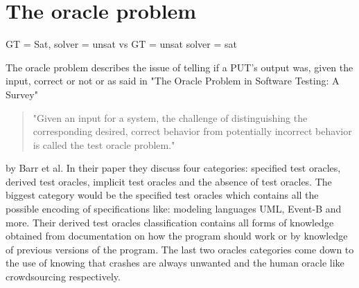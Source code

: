 \section{The oracle problem}
\label{cha:2:OracleProblem}
GT = Sat, solver = unsat vs GT = unsat solver = sat

The oracle problem describes the issue of telling if a PUT's output was, given the input, correct or not or as said in "The Oracle Problem in Software Testing: A Survey"\cite{10barr2014oracleProblem} 
\begin{quote}
	"Given an input for a system, the challenge of distinguishing the corresponding desired, correct behavior from potentially incorrect behavior is called the test oracle problem."
\end{quote} by Barr et al.
In their paper they discuss four categories: specified test oracles, derived test oracles, implicit test oracles and the absence of test oracles. The biggest category would be the specified test oracles which contains all the possible encoding of specifications like: modeling languages UML, Event-B and more. Their derived test oracles classification contains all forms of knowledge obtained from documentation on how the program should work or by knowledge of previous versions of the program. The last two oracles categories come down to the use of knowing that crashes are always unwanted and the human oracle like crowdsourcing respectively.


